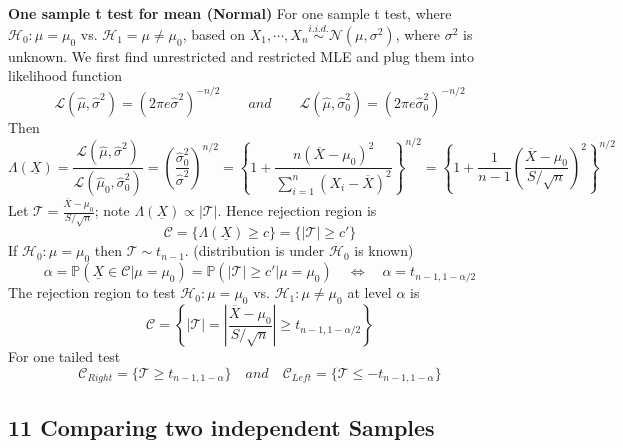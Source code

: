 \documentclass[11pt]{article}
\begin{document}
\begin{example}
  \textbf{One sample t test for mean (Normal)} For one sample t test, where $\mathcal{H}_0: \mu = \mu_0$ vs. $\mathcal{H}_1 = \mu \neq \mu_0$, based on $X_1, \cdots, X_n \stackrel{i.i.d.} {\sim} \mathcal{N}(\mu, \sigma^2)$, where $\sigma^2$ is unknown. We first find unrestricted and restricted MLE and plug them into likelihood function
  \[
    \mathcal{L}(\hat{\mu},\hat{\sigma}^2) = (2\pi e \hat{\sigma}^2)^{-n/2} \quad\quad and\quad\quad \mathcal{L}(\hat{\mu},\hat{\sigma}_0^2) = (2\pi e \hat{\sigma}_0^2)^{-n/2}
  \]
  Then
  \[
    \Lambda(\underline{X}) = \frac{\mathcal{L}(\hat{\mu}, \hat{\sigma}^2)}{\mathcal{L}(\hat{\mu}_0, \hat{\sigma}_0^2)} = \left( \frac{\hat{\sigma}_0^2}{\hat{\sigma}^2} \right)^{n/2} = \left\{ 1 + \frac{n(\overline{X} - \mu_0)^2}{\sum_{i=1}^n (X_i - \overline{X})^2} \right\}^{n/2} = \left\{ 1 + \frac{1}{n-1} \left( \frac{\overline{X} - \mu_0}{S / \sqrt{n}} \right)^2 \right\}^{n / 2}
  \]
  Let $\mathcal{T} =  \frac{\overline{X} - \mu_0}{S / \sqrt{n}}$; note $\Lambda(\underline{X}) \propto |\mathcal{T}|$. Hence rejection region is
  \[
    \mathcal{C} = \{ \Lambda(\underline{X}) \geq c \} = \{ | \mathcal{T}| \geq c'\}
  \]
  If $\mathcal{H}_0: \mu = \mu_0$ then $\mathcal{T} \sim t_{n-1}$. (distribution is under $\mathcal{H}_0$ is known)
  \[
    \alpha = \mathbb{P}\left(\underline{X} \in \mathcal{C} | \mu = \mu_0\right) = \mathbb{P}\left( |\mathcal{T}| \geq c'| \mu = \mu_0 \right) \quad \iff \quad \alpha = t_{n-1, 1 - \alpha/2}
  \]
  The rejection region to test $\mathcal{H}_0: \mu = \mu_0$ vs. $\mathcal{H}_1: \mu \neq \mu_0$ at level $\alpha$ is
  \[
    \mathcal{C} = \left\{ |\mathcal{T}| = \left| \frac{\overline{X} - \mu_0}{S / \sqrt{n}} \right| \geq t_{n-1, 1-\alpha/2} \right\}
  \]
  For one tailed test
  \[
    \mathcal{C}_{Right} = \{ \mathcal{T}\geq t_{n-1, 1 - \alpha}\} \quad and\quad \mathcal{C}_{Left} = \{ \mathcal{T}\leq -t_{n-1, 1 - \alpha}\}
  \]
\end{example}



\subsection*{11 Comparing two independent Samples}
\end{document}
